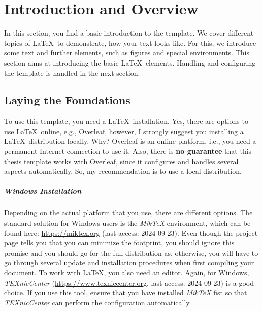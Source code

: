 
\chapter{Introduction and Overview}
\label{chp:Intro}
In this section, you find a basic introduction to the template. We cover different topics of \LaTeX\ to demonstrate, how your text looks like. For this, we introduce some text and further elements, such as figures and special environments. This section aims at introducing the basic \LaTeX\ elements. Handling and configuring the template is handled in the next section.

\section{Laying the Foundations}
\label{sec:1:LaTeX}
To use this template, you need a \LaTeX\ installation. Yes, there are options to use \LaTeX\ online, e.g., Overleaf, however, I strongly suggest you installing a \LaTeX\ distribution locally. Why? Overleaf is an online platform, i.e., you need a permanent Internet connection to use it. Also, there is \textbf{no guarantee} that this thesis template works with Overleaf, since it configures and handles several aspects automatically. So, my recommendation is to use a local distribution.

\paragraph*{Windows Installation}
Depending on the actual platform that you use, there are different options. The standard solution for Windows users is the \emph{MikTeX} environment, which can be found here: \url{https://miktex.org} (last access: 2024-09-23). Even though the project page tells you that you can minimize the footprint, you should ignore this promise and you should go for the full distribution as, otherwise, you will have to go through several update and installation procedures when first compiling your document. To work with \LaTeX, you also need an editor. Again, for Windows, \emph{TEXnicCenter} (\url{https://www.texniccenter.org}, last access: 2024-09-23) is a good choice. If you use this tool, ensure that you have installed \emph{MikTeX} fist so that \emph{TEXnicCenter} can perform the configuration automatically.

